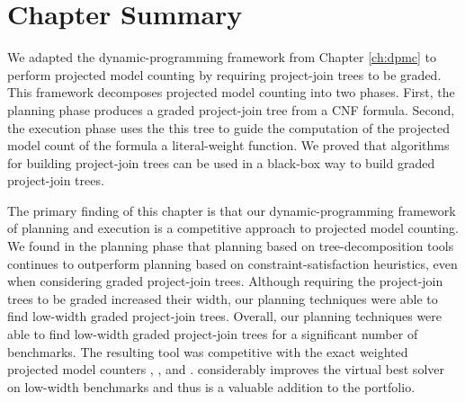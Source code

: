 \section{Chapter Summary}
\label{sec_procount_discussion}

We adapted the dynamic-programming framework from Chapter \ref{ch:dpmc} to perform projected model counting by requiring project-join trees to be graded.
This framework decomposes projected model counting into two phases.
First, the planning phase produces a graded project-join tree from a CNF formula.
Second, the execution phase uses the this tree to guide the computation of the projected model count of the formula \wrt{} a literal-weight function. 
We proved that algorithms for building project-join trees can be used in a black-box way to build graded project-join trees.

{ \color{blue}
The primary finding of this chapter is that our dynamic-programming framework of planning and execution is a competitive approach to projected model counting.
We found in the planning phase that planning based on tree-decomposition tools continues to outperform planning based on constraint-satisfaction heuristics, even when considering graded project-join trees.
Although requiring the project-join trees to be graded increased their width, our planning techniques were able to find low-width graded project-join trees.
Overall, our planning techniques were able to find low-width graded project-join trees for a significant number of benchmarks.
The resulting tool \procount{} was competitive with the exact weighted projected model counters \dfp{} \cite{lagniez2019recursive}, \projmc{} \cite{lagniez2019recursive}, and \ssat{} \cite{lee2017solving}. 
\procount{} considerably improves the virtual best solver on low-width benchmarks and thus is a valuable addition to the portfolio.
}  %
